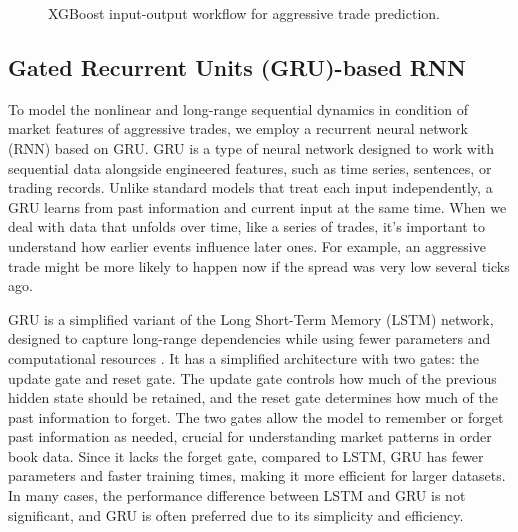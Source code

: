 \begin{figure}[H]
\centering
{}
\caption{XGBoost input-output workflow for aggressive trade prediction.}
\label{fig:xgboost-flow}
\end{figure}

\subsection{Gated Recurrent Units (GRU)-based RNN}
To model the nonlinear and long-range sequential dynamics in condition of market features of aggressive trades, we employ a recurrent neural network (RNN) based on GRU. GRU is a type of neural network designed to work with sequential data alongside engineered features, such as time series, sentences, or trading records. Unlike standard models that treat each input independently, a GRU learns from past information and current input at the same time. When we deal with data that unfolds over time, like a series of trades, it's important to understand how earlier events influence later ones. For example, an aggressive trade might be more likely to happen now if the spread was very low several ticks ago. 

GRU is a simplified variant of the Long Short-Term Memory (LSTM) network, designed to capture long-range dependencies while using fewer parameters and computational resources \citep{GRU2014}. It has a simplified architecture with two gates: the update gate and reset gate. The update gate controls how much of the previous hidden state should be retained, and the reset gate determines how much of the past information to forget. The two gates allow the model to remember or forget past information as needed, crucial for understanding market patterns in order book data. Since it lacks the forget gate, compared to LSTM, GRU has fewer parameters and faster training times, making it more efficient for larger datasets. In many cases, the performance difference between LSTM and GRU is not significant, and GRU is often preferred due to its simplicity and efficiency. 

